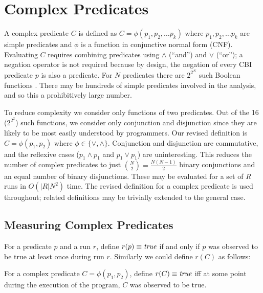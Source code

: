 
\section{Complex Predicates}
\label{sec-complex-preds}
A complex predicate $C$ is defined as $C = \phi(p_1, p_2, \ldots p_k)$ where 
$p_1, p_2, \ldots p_k$ are simple predicates and $\phi$ is a function in 
conjunctive normal form (CNF).  Evaluating $C$ requires combining predicates 
using $\wedge$ (``and'') and $\vee$ (``or''); a negation operator is not required 
because by design, the negation of every CBI predicate $p$ is also a predicate.  
For $N$ predicates there are $2^{2^N}$ such Boolean functions 
\cite{MathWorld:BoolFuncs}.  There may be hundreds of simple predicates involved 
in the analysis, and so this a prohibitively large number.

To reduce complexity we consider only functions of two predicates.  Out of the
16 ($2^{2^2}$) such functions, we consider only conjunction and disjunction since
they are likely to be most easily understood by programmers.  Our revised
definition is $C = \phi(p_1, p_2)$ where $\phi \in \{\vee, \wedge\}$.  Conjunction
and disjunction are commutative, and the reflexive cases ($p_1 \wedge p_1$ and 
$p_1 \vee p_1$) are uninteresting.  This reduces the number of complex predicates
to just ${N \choose 2} = \frac{N (N-1)}{2}$ binary conjunctions and an equal number 
of binary disjunctions.  These may be evaluated for a set of $R$ runs in $O(|R| N^2)$ 
time.  The revised definition for a complex predicate is used throughout; related
definitions may be trivially extended to the general case.

\subsection{Measuring Complex Predicates}
\label{sec-measuring}

For a predicate $p$ and a run $r$, define $r(p) \equiv \mathit{true}$ if and only if $p$ was observed to be true at least once during run $r$.  Similarly we could define $r(C)$ as follows:
\begin{defn}
\label{dfn1}
For a complex predicate $C = \phi(p_1, p_2)$, define $r(C) \equiv \mathit{true}$ iff at some point during the execution of the program, $C$ was observed to be true.
\end{defn}

